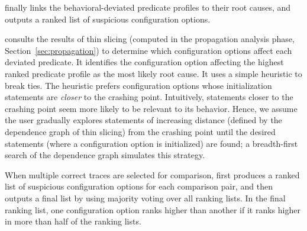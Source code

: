 \ourtool finally links the behavioral-deviated
predicate profiles to their root causes, and outputs a ranked list of suspicious
configuration options.

\ourtool consults the results of thin slicing (computed in the propagation
analysis phase, Section~\ref{sec:propagation}) to determine which
configuration options affect each deviated predicate.
It identifies the configuration option
affecting the highest ranked predicate profile as the most likely
root cause.  It uses a simple heuristic to break ties.
The heuristic prefers configuration options whose initialization
statements are \textit{closer} to the
crashing point. Intuitively, statements closer to the
crashing point seem more likely to be relevant to its behavior.
Hence, we assume the user gradually explores statements of
increasing distance (defined by the dependence graph of thin slicing)
from the crashing point until the desired statements (where a configuration
option is initialized) are found; a breadth-first
search of the dependence graph simulates this strategy.


When multiple correct traces are selected for comparison,
\ourtool first produces a ranked list of suspicious
configuration options for each comparison pair, and then outputs
a final list by using majority voting over all ranking lists.
In the final ranking list, one configuration option ranks higher
than another if it ranks higher in more than half of the ranking lists.


